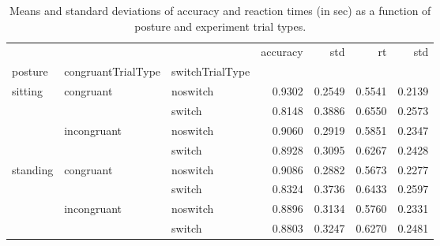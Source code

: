 \begin{table}
\centering
\caption{Means and standard deviations of accuracy and reaction times (in sec) as a function of posture and experiment trial types.}
\label{table-task-switching-replication-reaction-time}
\begin{tabular}{lllrrrr}
\toprule
         &             &        & accuracy &    std &     rt &    std \\
posture & congruantTrialType & switchTrialType &          &        &        &        \\
\midrule
sitting & congruant & noswitch &   0.9302 & 0.2549 & 0.5541 & 0.2139 \\
         &             & switch &   0.8148 & 0.3886 & 0.6550 & 0.2573 \\
         & incongruant & noswitch &   0.9060 & 0.2919 & 0.5851 & 0.2347 \\
         &             & switch &   0.8928 & 0.3095 & 0.6267 & 0.2428 \\
standing & congruant & noswitch &   0.9086 & 0.2882 & 0.5673 & 0.2277 \\
         &             & switch &   0.8324 & 0.3736 & 0.6433 & 0.2597 \\
         & incongruant & noswitch &   0.8896 & 0.3134 & 0.5760 & 0.2331 \\
         &             & switch &   0.8803 & 0.3247 & 0.6270 & 0.2481 \\
\bottomrule
\end{tabular}
\end{table}
